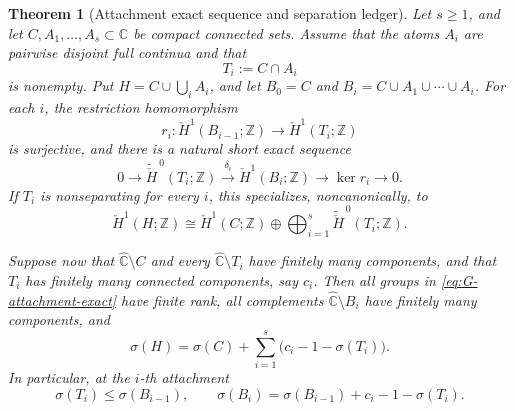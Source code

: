 \documentclass[11pt,reqno]{amsart}
\newtheorem{theorem}{Theorem}[section]
\theoremstyle{definition}
\theoremstyle{remark}
\newcommand{\C}{\mathbb C}
\newcommand{\Z}{\mathbb Z}
\newcommand{\Chat}{\widehat{\mathbb C}}
\begin{document}
\begin{theorem}[Attachment exact sequence and separation ledger]
\label{thm:separation-budget}
Let $s\ge1$, and let $C,A_1,\dots,A_s\subset\C$ be compact connected sets.
Assume that the
atoms $A_i$ are pairwise disjoint full continua and that
\[
 T_i:=C\cap A_i
\]
is nonempty.  Put $H=C\cup\bigcup_iA_i$, and let
$B_0=C$ and $B_i=C\cup A_1\cup\cdots\cup A_i$.  For each $i$, the
restriction homomorphism
\[
 r_i\colon\check H^1(B_{i-1};\Z)\longrightarrow
 \check H^1(T_i;\Z)
\]
is surjective, and there is a natural short exact
sequence
\begin{equation}
 0\longrightarrow
 \widetilde{\check H}^{\,0}(T_i;\Z)
 \xrightarrow{\ \delta_i\ }
 \check H^1(B_i;\Z)
 \longrightarrow
 \ker r_i
 \longrightarrow0.
 \label{eq:G-attachment-exact}
\end{equation}
If $T_i$ is nonseparating for every $i$, this specializes, noncanonically,
to
\begin{equation}
 \check H^1(H;\Z)
 \cong
 \check H^1(C;\Z)\oplus
 \bigoplus_{i=1}^{s}
 \widetilde{\check H}^{\,0}(T_i;\Z).
 \label{eq:G-attachment-splitting}
\end{equation}

Suppose now that $\Chat\setminus C$ and every
$\Chat\setminus T_i$ have finitely many components, and that $T_i$ has
finitely many connected components, say $c_i$.  Then all groups in
\eqref{eq:G-attachment-exact} have finite rank, all complements
$\Chat\setminus B_i$ have finitely many components, and
\begin{equation}
 \boxed{\quad
 \sigma(H)=\sigma(C)+
 \sum_{i=1}^{s}\bigl(c_i-1-\sigma(T_i)\bigr).
 \quad}
 \label{eq:G-budget}
\end{equation}
In particular, at the $i$-th attachment
\begin{equation}
 \sigma(T_i)\le \sigma(B_{i-1}),
 \qquad
 \sigma(B_i)=\sigma(B_{i-1})+c_i-1-\sigma(T_i).
 \label{eq:G-step-ledger}
\end{equation}
\end{theorem}
\end{document}
